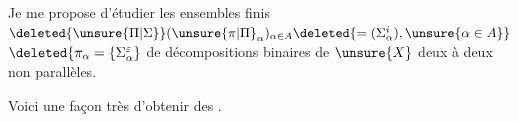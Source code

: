 Je me propose d'étudier les ensembles finis  $\deleted{\unsure{\Pi|\Sigma}}(\unsure{\pi|\Pi}_\alpha)_{\alpha\in A}\deleted{=(\Sigma_\alpha^i),\unsure{\alpha\in A}}$ $\deleted{\pi_\alpha=\{\Sigma_\alpha^\varepsilon}$ de décompositions binaires de $\unsure{X}$ deux à deux non parallèles.

Voici une façon très  d'obtenir des .

